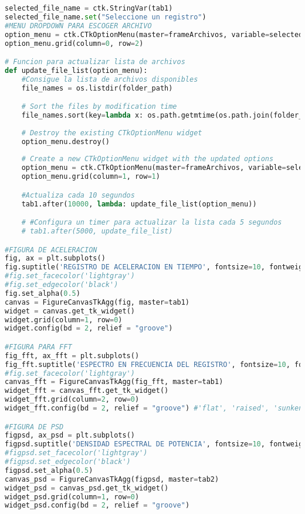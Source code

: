 \begin{lstlisting}[language=Python, caption=Código para interfaz gráfica de control y monitoreo]
selected_file_name = ctk.StringVar(tab1)
selected_file_name.set("Seleccione un registro")
#MENU DROPDOWN PARA ESCOGER ARCHIVO
option_menu = ctk.CTkOptionMenu(master=frameArchivos, variable=selected_file_name, values=file_names)
option_menu.grid(column=0, row=2)

# Funcion para actualizar lista de archivos
def update_file_list(option_menu):
    #Consigue la lista de archivos disponibles
    file_names = os.listdir(folder_path)

    # Sort the files by modification time
    file_names.sort(key=lambda x: os.path.getmtime(os.path.join(folder_path, x)))
    
    # Destroy the existing CTkOptionMenu widget
    option_menu.destroy()
    
    # Create a new CTkOptionMenu widget with the updated options
    option_menu = ctk.CTkOptionMenu(master=frameArchivos, variable=selected_file_name, values=file_names)
    option_menu.grid(column=1, row=1)

    #Actualiza cada 10 segundos
    tab1.after(10000, lambda: update_file_list(option_menu)) 

    # #Configura un timer para actualizar la lista cada 5 segundos
    # tab1.after(5000, update_file_list)

#FIGURA DE ACELERACION
fig, ax = plt.subplots()
fig.suptitle('REGISTRO DE ACELERACION EN TIEMPO', fontsize=10, fontweight='bold')
#fig.set_facecolor('lightgray')
#fig.set_edgecolor('black')
fig.set_alpha(0.5)
canvas = FigureCanvasTkAgg(fig, master=tab1)
widget = canvas.get_tk_widget()
widget.grid(column=1, row=0)
widget.config(bd = 2, relief = "groove")

#FIGURA PARA FFT
fig_fft, ax_fft = plt.subplots()
fig_fft.suptitle('ESPECTRO EN FRECUENCIA DEL REGISTRO', fontsize=10, fontweight='bold')
#fig.set_facecolor('lightgray')
canvas_fft = FigureCanvasTkAgg(fig_fft, master=tab1)
widget_fft = canvas_fft.get_tk_widget()
widget_fft.grid(column=2, row=0)
widget_fft.config(bd = 2, relief = "groove") #'flat', 'raised', 'sunken', 'ridge', 'groove' and 'solid'.

#FIGURA DE PSD
figpsd, ax_psd = plt.subplots()
figpsd.suptitle('DENSIDAD ESPECTRAL DE POTENCIA', fontsize=10, fontweight='bold')
#figpsd.set_facecolor('lightgray')
#figpsd.set_edgecolor('black')
figpsd.set_alpha(0.5)
canvas_psd = FigureCanvasTkAgg(figpsd, master=tab2)
widget_psd = canvas_psd.get_tk_widget()
widget_psd.grid(column=1, row=0)
widget_psd.config(bd = 2, relief = "groove")


\end{lstlisting}
